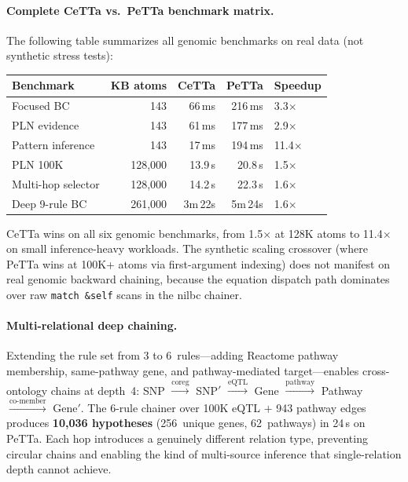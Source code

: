 \documentclass[11pt]{article}
\newcommand{\code}[1]{\texttt{#1}}
\newcommand{\PeTTa}{\textup{PeTTa}}
\newcommand{\CeTTa}{\textup{CeTTa}}
\begin{document}
\paragraph{Complete CeTTa vs.\ PeTTa benchmark matrix.}
The following table summarizes all genomic benchmarks on real data
(not synthetic stress tests):

\begin{center}
\begin{tabular}{lrrrl}
\toprule
Benchmark & KB atoms & \CeTTa{} & \PeTTa{} & Speedup \\
\midrule
Focused BC         &     143 &   66\,ms &   216\,ms & 3.3$\times$ \\
PLN evidence       &     143 &   61\,ms &   177\,ms & 2.9$\times$ \\
Pattern inference  &     143 &   17\,ms &   194\,ms & 11.4$\times$ \\
PLN 100K           & 128{,}000 &  13.9\,s &   20.8\,s & 1.5$\times$ \\
Multi-hop selector & 128{,}000 &  14.2\,s &   22.3\,s & 1.6$\times$ \\
Deep 9-rule BC     & 261{,}000 & 3m\,22s  &  5m\,24s  & 1.6$\times$ \\
\bottomrule
\end{tabular}
\end{center}

\CeTTa{} wins on all six genomic benchmarks, from 1.5$\times$ at 128K
atoms to 11.4$\times$ on small inference-heavy workloads.  The
synthetic scaling crossover (where \PeTTa{} wins at 100K+ atoms via
first-argument indexing) does not manifest on real genomic backward
chaining, because the equation dispatch path dominates over raw
\code{match~\&self} scans in the nilbc chainer.

\paragraph{Multi-relational deep chaining.}
Extending the rule set from 3 to 6~rules---adding Reactome pathway
membership, same-pathway gene, and pathway-mediated target---enables
cross-ontology chains at depth~4:
SNP $\xrightarrow{\text{coreg}}$ SNP$'$
$\xrightarrow{\text{eQTL}}$ Gene
$\xrightarrow{\text{pathway}}$ Pathway
$\xrightarrow{\text{co-member}}$ Gene$'$.
The 6-rule chainer over 100K eQTL $+$ 943 pathway edges produces
\textbf{10{,}036 hypotheses} (256~unique genes, 62~pathways)
in 24\,s on \PeTTa{}.  Each hop introduces a genuinely different
relation type, preventing circular chains and enabling the kind of
multi-source inference that single-relation depth cannot achieve.
\end{document}
